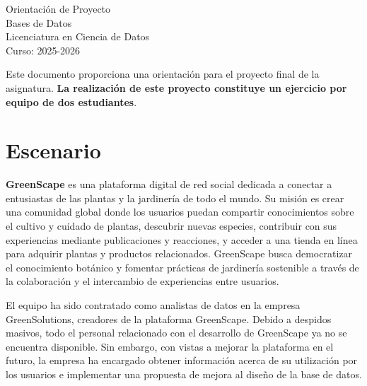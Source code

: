 \documentclass[10pt]{article}
\date{\displaydate{date}}
\begin{document}

	\begin{centering}

		\huge Orientación de Proyecto \\[2mm]

		\small Bases de Datos\\
		Licenciatura en Ciencia de Datos\\
		Curso: 2025-2026

	\end{centering}

	\vspace{2mm}

	Este documento proporciona una orientación para el proyecto final de la asignatura. \textbf{La realización de este proyecto constituye un ejercicio por equipo de dos estudiantes}.

	\section*{Escenario}

	\textbf{GreenScape} es una plataforma digital de red social dedicada a conectar a entusiastas de las plantas y la jardinería de todo el mundo. Su misión es crear una comunidad global donde los usuarios puedan compartir conocimientos sobre el cultivo y cuidado de plantas, descubrir nuevas especies, contribuir con sus experiencias mediante publicaciones y reacciones, y acceder a una tienda en línea para adquirir plantas y productos relacionados. GreenScape busca democratizar el conocimiento botánico y fomentar prácticas de jardinería sostenible a través de la colaboración y el intercambio de experiencias entre usuarios.

	El equipo ha sido contratado como analistas de datos en la empresa GreenSolutions, creadores de la plataforma GreenScape. Debido a despidos masivos, todo el personal relacionado con el desarrollo de GreenScape ya no se encuentra disponible. Sin embargo, con vistas a mejorar la plataforma en el futuro, la empresa ha encargado obtener información acerca de su utilización por los usuarios e implementar una propuesta de mejora al diseño de la base de datos.
\end{document}
